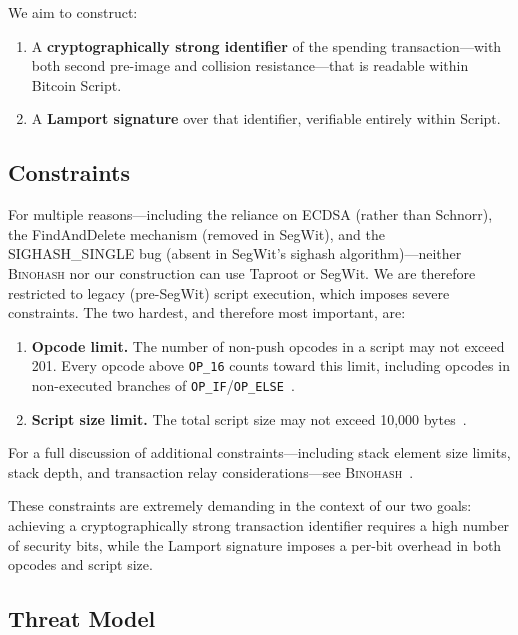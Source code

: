 \documentclass[11pt, a4paper]{article}
\begin{document}
We aim to construct:
\begin{enumerate}
    \item A \textbf{cryptographically strong identifier} of the spending transaction---with both second pre-image and collision resistance---that is readable within Bitcoin Script.
    \item A \textbf{Lamport signature} over that identifier, verifiable entirely within Script.
\end{enumerate}

\subsection{Constraints}
\label{sec:constraints}

For multiple reasons---including the reliance on ECDSA (rather than Schnorr), the FindAndDelete mechanism (removed in SegWit), and the SIGHASH\_SINGLE bug (absent in SegWit's sighash algorithm)---neither \textsc{Binohash} nor our construction can use Taproot or SegWit. We are therefore restricted to legacy (pre-SegWit) script execution, which imposes severe constraints. The two hardest, and therefore most important, are:

\begin{enumerate}
    \item \textbf{Opcode limit.} The number of non-push opcodes in a script may not exceed 201. Every opcode above \texttt{OP\_16} counts toward this limit, including opcodes in non-executed branches of \texttt{OP\_IF}/\texttt{OP\_ELSE}~\cite[Section~6]{linus2024binohash}.
    \item \textbf{Script size limit.} The total script size may not exceed 10,000 bytes~\cite[Section~6]{linus2024binohash}.
\end{enumerate}

\noindent For a full discussion of additional constraints---including stack element size limits, stack depth, and transaction relay considerations---see \textsc{Binohash}~\cite[Section~6]{linus2024binohash}.

These constraints are extremely demanding in the context of our two goals: achieving a cryptographically strong transaction identifier requires a high number of security bits, while the Lamport signature imposes a per-bit overhead in both opcodes and script size.

\subsection{Threat Model}
\label{sec:threat-model}
\end{document}
